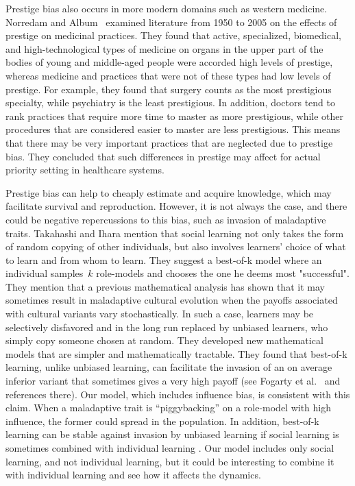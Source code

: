 \documentclass[12pt]{extarticle}
\begin{document}
{Prestige bias also occurs} in more modern domains such as western medicine.
Norredam and Album~\citep{medical_prestige} examined literature from 1950 to 2005 on the effects of prestige on medicinal practices. They found that active, specialized, biomedical, and high-technological types of medicine on organs in the upper part of the bodies of young and middle-aged people were accorded high levels of prestige, whereas medicine and practices that were not of these types had low levels of prestige.
For example, they found that surgery counts as the most prestigious specialty, while psychiatry is the {least} prestigious.
In addition, doctors tend to rank practices that require more time to master as more prestigious, while other procedures that are considered easier to master are less prestigious. 
This means that there may be very important practices that are neglected due to prestige bias.
They concluded that such differences in prestige may {affect} for actual priority setting in healthcare systems.

Prestige bias can help to cheaply estimate and acquire knowledge, which may facilitate survival and reproduction. However, it is not always the case, and there could be negative repercussions to this bias, such as invasion of maladaptive traits.
{Takahashi and Ihara} \citep{best_of_k} mention that social learning not only takes the form of random copying of other individuals, but also involves learners' choice of what to learn and from whom to learn. They suggest a best-of-k model where an individual samples~$k$ role-models and chooses the one he deems most "successful". They {mention} that a previous mathematical analysis has shown that it may sometimes result in maladaptive cultural evolution when the payoffs associated with cultural variants vary stochastically. In such a case, learners may be selectively disfavored and in the long run replaced by unbiased learners, who simply copy someone chosen at random. They developed new mathematical models that are simpler and mathematically tractable. They found that best-of-k learning, unlike unbiased learning, can facilitate the invasion of an on average inferior variant that sometimes gives a very high payoff {(see Fogarty et al.\ \citep{Fogarty2017} and references there)}. Our model, which includes influence bias, is consistent with this claim. When a maladaptive trait is ``piggybacking'' {on} a role-model with high influence, {the former} could spread in the population.
In addition, {best}-of-k learning can be stable against invasion by unbiased learning if social learning is sometimes combined with individual learning \citep{best_of_k}. 
Our model {includes only} social learning, and not individual learning, but it could be interesting to combine it with individual learning and see how it affects the dynamics.
\end{document}
